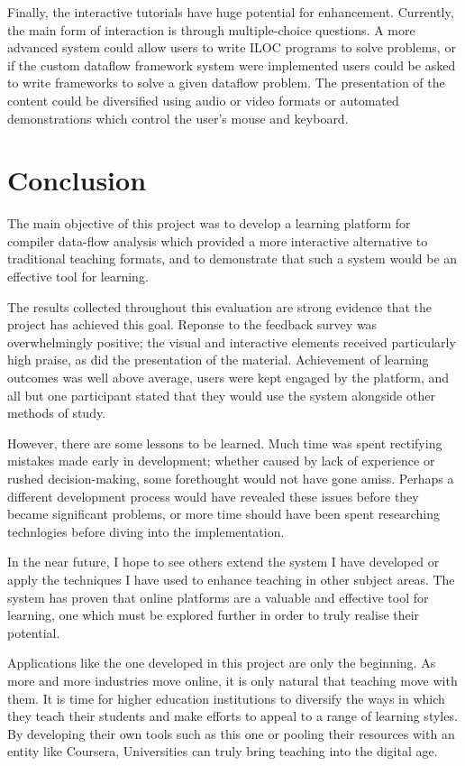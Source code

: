 \documentclass[bsc,twoside,singlespacing,parskip,logo,notimes,normalheadings]{infthesis}
\begin{document}
    Finally, the interactive tutorials have huge potential for
    enhancement. Currently, the main form of interaction is through
    multiple-choice questions. A more advanced system could allow
    users to write ILOC programs to solve problems, or if the custom
    \gls{dataflow} framework system were implemented users could be
    asked to write frameworks to solve a given \gls{dataflow}
    problem. The presentation of the content could be diversified
    using audio or video formats or automated demonstrations which
    control the user's mouse and keyboard.

    \section{Conclusion}
    The main objective of this project was to develop a learning
    platform for compiler data-flow analysis which provided a more
    interactive alternative to traditional teaching formats, and to
    demonstrate that such a system would be an effective tool for
    learning.

    The results collected throughout this evaluation are strong
    evidence that the project has achieved this goal. Reponse to the
    feedback survey was overwhelmingly positive; the visual and
    interactive elements received particularly high praise, as did the
    presentation of the material. Achievement of learning outcomes was
    well above average, users were kept engaged by the platform, and
    all but one participant stated that they would use the system
    alongside other methods of study.

    However, there are some lessons to be learned. Much time was spent
    rectifying mistakes made early in development; whether caused by
    lack of experience or rushed decision-making, some forethought
    would not have gone amiss. Perhaps a different development process
    would have revealed these issues before they became significant
    problems, or more time should have been spent researching
    technlogies before diving into the implementation.

    In the near future, I hope to see others extend the system I have
    developed or apply the techniques I have used to enhance teaching
    in other subject areas. The system has proven that online
    platforms are a valuable and effective tool for learning, one
    which must be explored further in order to truly realise their
    potential.

    Applications like the one developed in this project are only the
    beginning. As more and more industries move online, it is only
    natural that teaching move with them. It is time for higher
    education institutions to diversify the ways in which they teach
    their students and make efforts to appeal to a range of learning
    styles. By developing their own tools such as this one or pooling
    their resources with an entity like Coursera, Universities can
    truly bring teaching into the digital age.
    
\end{document}
